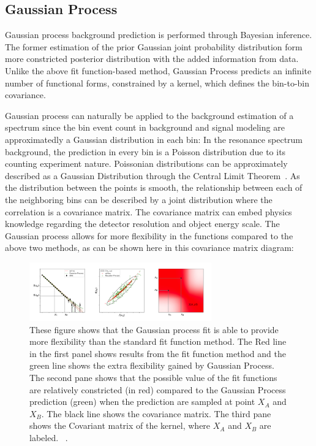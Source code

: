     \subsection{Gaussian Process} 
    \label{sec:GP}

    Gaussian process background prediction is performed through Bayesian inference. The former estimation of the prior Gaussian joint probability distribution form more constricted posterior distribution with the added information from data. Unlike the above fit function-based method, Gaussian Process predicts an infinite number of functional forms, constrained by a kernel, which defines the bin-to-bin covariance.


    Gaussian process can naturally be applied to the background estimation of a spectrum since the bin event count in background and signal modeling are approximatedly a Gaussian distribution in each bin: In the resonance spectrum background, the prediction in every bin is a Poisson distribution due to its counting experiment nature. Poissonian distributions can be approximately described as a Gaussian Distribution through the Central Limit Theorem~\cite{kwak2017central}. As the distribution between the points is smooth, the relationship between each of the neighboring bins can be described by a joint distribution where the correlation is a covariance matrix. The covariance matrix can embed physics knowledge regarding the detector resolution and object energy scale. The Gaussian process allows for more flexibility in the functions compared to the above two methods, as can be shown here in this covariance matrix diagram:

    \begin{figure}[!htb]
        \begin{center}
            \includegraphics[width=0.7\textwidth]{figures/chapter_analysismethod/GP}
            \caption{
                These figure shows that the Gaussian process fit is able to provide more flexibility than the standard fit function method. The Red line in the first panel shows results from the fit function method and the green line shows the extra flexibility gained by Gaussian Process. The second pane shows that the possible value of the fit functions are relatively constricted (in red) compared to the Gaussian Process prediction (green) when the prediction are sampled at point $X_{A}$ and $X_{B}$. The black line shows the covariance matrix. The third pane shows the Covariant matrix of the kernel, where $X_{A}$ and $X_{B}$ are labeled. ~\cite{frate2017modeling}.
            }
            \label{fig:GaussianProcess}
        \end{center}
    \end{figure}
    \FloatBarrier


